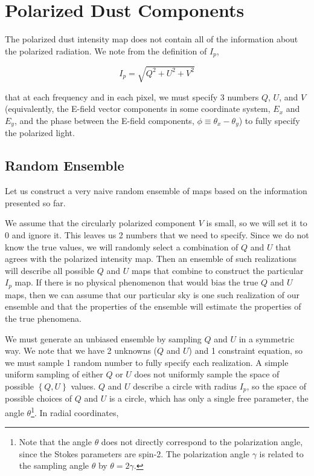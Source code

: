 \documentclass[twoside,10pt]{article}
\newcommand{\pc}[1]{\left\{ #1 \right\} }
\begin{document}
\section{Polarized Dust Components}
\label{sec:polarized_dust_components}

The polarized dust intensity map does not contain all of the information
about the polarized radiation. We note from the definition of $I_p$,

\begin{equation}
    I_p = \sqrt{Q^2 + U^2 + V^2}
\end{equation}

that at each frequency and in each pixel, we must specify 3 numbers $Q$, $U$,
and $V$ (equivalently, the E-field vector components in some coordinate
system, $E_x$ and $E_y$, and the phase between the E-field components,
$\phi \equiv \theta_x - \theta_y$)\cite{kamionkowski_statistics_1997}
to fully specify the polarized light.

\subsection{Random Ensemble}
\label{sub:random_ensemble}

Let us construct a very naive random ensemble of maps based on the information
presented so far.

We assume that the circularly polarized component $V$ is
small\cite{mainini_improved_2013}, so we will set it to 0 and ignore it. This
leaves us 2 numbers that we need to specify. Since we do not know the true
values, we will randomly select a combination of $Q$ and $U$ that agrees with
the polarized intensity map. Then an ensemble of such realizations will
describe all possible $Q$ and $U$ maps that combine to construct the
particular $I_p$ map. If there is no physical phenomenon that would bias the
true $Q$ and $U$ maps, then we can assume that our particular sky is one such
realization of our ensemble and that the properties of the ensemble will
estimate the properties of the true phenomena.

We must generate an unbiased ensemble by sampling $Q$ and $U$ in a symmetric
way. We note that we have 2 unknowns ($Q$ and $U$) and 1 constraint equation,
so we must sample 1 random number to fully specify each realization. A simple
uniform sampling of either $Q$ or $U$ does not uniformly sample the space of
possible $\pc{Q, U}$ values. $Q$ and $U$ describe a circle with radius $I_p$,
so the space of possible choices of $Q$ and $U$ is a circle, which has only a
single free parameter, the angle $\theta$\footnote{Note that the angle
$\theta$ does not directly correspond to the polarization angle, since the
Stokes parameters are spin-2. The polarization angle $\gamma$ is related to
the sampling angle $\theta$ by $\theta = 2\gamma$.}. In radial coordinates,
\end{document}
